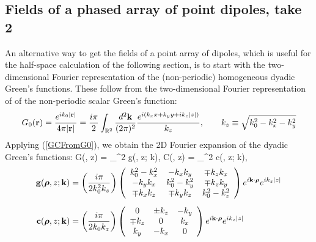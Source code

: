 \documentclass[letterpaper]{article}
\begin{document}
\subsection*{Fields of a phased array of point dipoles, take 2}

An alternative way to get the fields of a point array of dipoles,
which is useful for the half-space calculation of the following
section, is to start with the two-dimensional Fourier representation 
of the (non-periodic) homogeneous dyadic Green's functions.
These follow from the two-dimensional Fourier representation of 
of the non-periodic scalar Green's function:
$$ G_0(\mathbf{r})=\frac{e^{ik_0 |\mathbf{r}|}}{4\pi |\mathbf{r}|}
   =
   \frac{i\pi}{2}
   \int_{\mathbb R^2} \frac{d^2 \mathbf{k}}{(2\pi)^2}
    \frac{e^{i(k_x x + k_y y + ik_z|z|)}}{k_z},
   \qquad
   k_z\equiv \sqrt{k_0^2 - k_x^2 - k_y^2}
$$
Applying (\ref{GCFromG0}), 
we obtain the 2D Fourier expansion of the dyadic Green's functions:
{
\vb G(\vbrho, z)
 = \int_{^2}
      \vb g(\vbrho, z; \vb k),
\qquad
\vb C(\vbrho, z)
 = \int_{^2}
      \vb c(\vbrho, z; \vb k),
}
\begin{subequations}
\begin{align}
\mathbf{g}(\boldsymbol{\rho}, z; \mathbf{k})
&= \left(\frac{i\pi}{2k_0^2 k_z}\right)
   \left(\begin{array}{ccc}
    k_0^2-k_x^2      & -k_x k_y     & \mp k_z k_x \\
    -k_y k_x         & k_0^2-k_y^2  & \mp k_z k_y \\
    \mp  k_x k_z     & \mp k_y k_z  & k_0^2-k_z^2
    \end{array}\right) e^{i\mathbf{k} \cdot \boldsymbol{\rho}} e^{i k_z |z|}
\\[5pt]
\mathbf{c}(\boldsymbol{\rho}, z; \mathbf{k})
 &= \left(\frac{i \pi}{2k_0 k_z}\right)
     \left(\begin{array}{ccc}
         0 & \pm k_z & -k_y \\
  \mp k_z  & 0       &  k_x \\
      k_y  & -k_x    &  0 
     \end{array}\right) e^{i\mathbf{k} \cdot \boldsymbol{\rho}} e^{i k_z |z|}
\end{align}
\label{gc}
\end{subequations}
\end{document}
